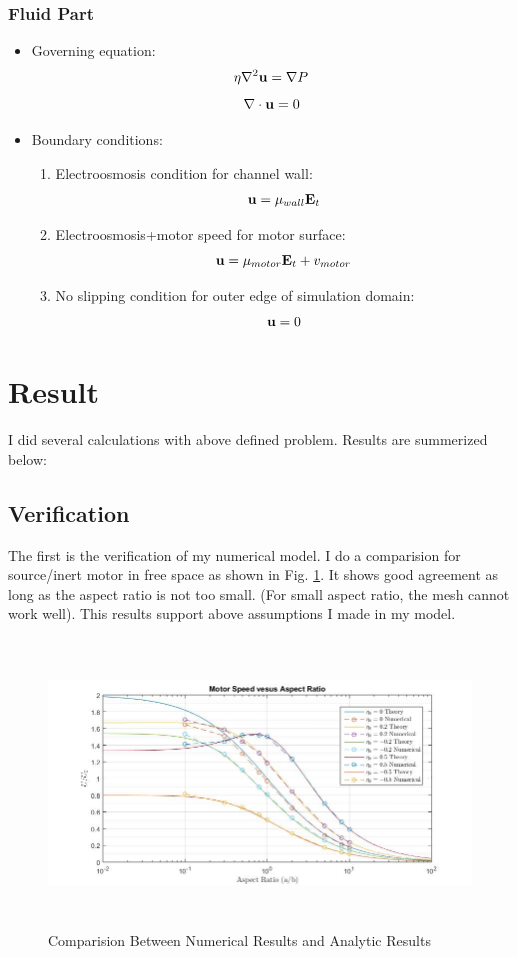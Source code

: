 \documentclass[fontsize=11pt, %
                             paper=a4, %
                             twoside, %
                             captions=tableheading,
                             index=totoc,
                             hyperref]{labbook}
\begin{document}
\begin{addmargin}[4cm]{0cm}
\subsubsection{Fluid Part}
\begin{itemize}
\item Governing equation:
\begin{equation}
\eta \nabla^2 \mathbf{u} = \nabla P
\end{equation}
\begin{equation}
\nabla \cdot \mathbf{u} =0
\end{equation}
\item Boundary conditions:
\begin{enumerate}
\item
Electroosmosis condition for channel wall:
\begin{equation}
\mathbf{u} = \mu_{wall} \mathbf{E}_t
\end{equation}
\item
Electroosmosis+motor speed for motor surface:
\begin{equation}
\mathbf{u} = \mu_{motor} \mathbf{E}_t + v_{motor}
\end{equation}
\item
No slipping condition for outer edge of simulation domain:
\begin{equation}
\mathbf{u} =0
\end{equation}
\end{enumerate}
\end{itemize}
\section*{Result}
I did several calculations with above defined problem. Results are summerized below:
\subsection*{Verification}
The first is the verification of my numerical model. I do a comparision for source/inert motor in free space as shown in Fig. \ref{2016-11-13-CBNRAAR}. It shows good agreement as long as the aspect ratio is not too small. (For small aspect ratio, the mesh cannot work well). This results support above assumptions I made in my model.
\begin{figure}
\centering
\includegraphics[width=\linewidth, height=3in]{2016-10-26-verification.jpg}
\caption{Comparision Between Numerical Results and Analytic Results}\label{2016-11-13-CBNRAAR}
\end{figure}

\end{addmargin}
\end{document}
